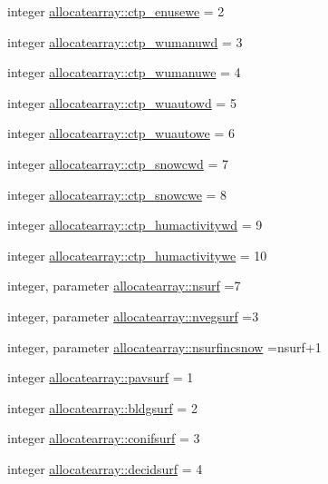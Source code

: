 \begin{DoxyCompactItemize}
\item 
integer \hyperlink{namespaceallocatearray_a8600e309a5cc40b15e9d6ed59234d88c}{allocatearray\+::ctp\+\_\+enusewe} = 2
\item 
integer \hyperlink{namespaceallocatearray_a653dc317607ec2d3939d4d43ca19f3ab}{allocatearray\+::ctp\+\_\+wumanuwd} = 3
\item 
integer \hyperlink{namespaceallocatearray_ad3747ba618ea8936638fd9932176d53b}{allocatearray\+::ctp\+\_\+wumanuwe} = 4
\item 
integer \hyperlink{namespaceallocatearray_ac4f67ea2cde8a8c62674b569206a23f4}{allocatearray\+::ctp\+\_\+wuautowd} = 5
\item 
integer \hyperlink{namespaceallocatearray_aa11b207d82e90d48132f6fece7b41b0b}{allocatearray\+::ctp\+\_\+wuautowe} = 6
\item 
integer \hyperlink{namespaceallocatearray_a71f069bc1dc0c9fbbd2f1d41c52e680e}{allocatearray\+::ctp\+\_\+snowcwd} = 7
\item 
integer \hyperlink{namespaceallocatearray_abeccf0f1712b43060c7f0ceb1bc242da}{allocatearray\+::ctp\+\_\+snowcwe} = 8
\item 
integer \hyperlink{namespaceallocatearray_a6f461398489aaac2f0d3bbeccfaf9b50}{allocatearray\+::ctp\+\_\+humactivitywd} = 9
\item 
integer \hyperlink{namespaceallocatearray_ac3cf90e10de86031186d0234e35581e2}{allocatearray\+::ctp\+\_\+humactivitywe} = 10
\item 
integer, parameter \hyperlink{namespaceallocatearray_acd22f92a06f7e9a2a91426b3dc99fdb0}{allocatearray\+::nsurf} =7
\item 
integer, parameter \hyperlink{namespaceallocatearray_abb987c3b35dd321963fd53d38f10236f}{allocatearray\+::nvegsurf} =3
\item 
integer, parameter \hyperlink{namespaceallocatearray_af4d113f332b6759cfa22271140c9162d}{allocatearray\+::nsurfincsnow} =nsurf+1
\item 
integer \hyperlink{namespaceallocatearray_a5a6ce5dda0d024d7333d95ba544f38c9}{allocatearray\+::pavsurf} = 1
\item 
integer \hyperlink{namespaceallocatearray_afbbcbdfd67c32839a537f74d1bc6ff5a}{allocatearray\+::bldgsurf} = 2
\item 
integer \hyperlink{namespaceallocatearray_a459c0f2a9b9bf9bf8924b97f81b774b6}{allocatearray\+::conifsurf} = 3
\item 
integer \hyperlink{namespaceallocatearray_a7d7cb2bf89442acf85652779a9f82c2d}{allocatearray\+::decidsurf} = 4

\end{DoxyCompactItemize}
